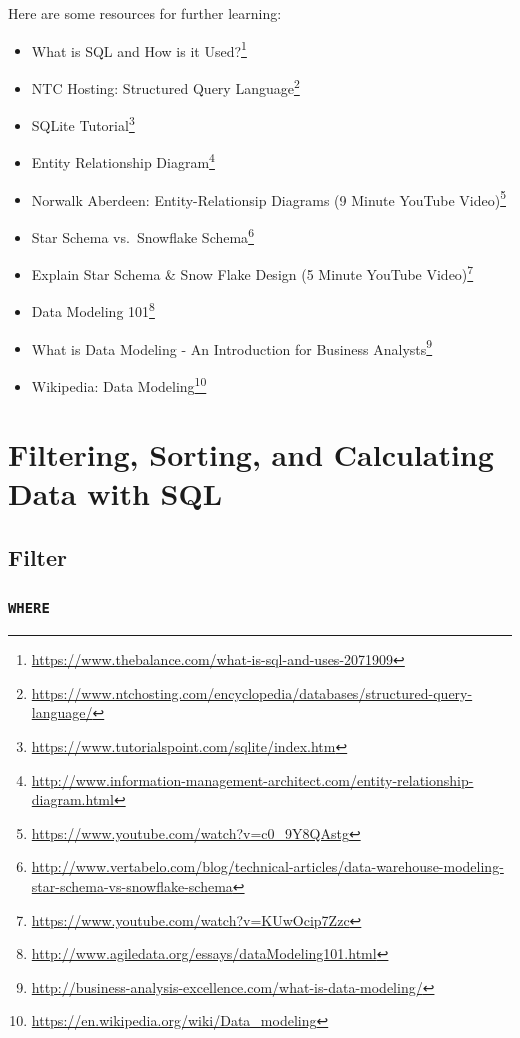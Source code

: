 \documentclass[]{book}
\providecommand{\tightlist}{%
  \setlength{\itemsep}{0pt}\setlength{\parskip}{0pt}}
\renewcommand{\href}[2]{#2\footnote{\url{#1}}}
\theoremstyle{definition}
\theoremstyle{definition}
\theoremstyle{remark}
\begin{document}
Here are some resources for further learning:

\begin{itemize}
\tightlist
\item
  \href{https://www.thebalance.com/what-is-sql-and-uses-2071909}{What is
  SQL and How is it Used?}
\item
  \href{https://www.ntchosting.com/encyclopedia/databases/structured-query-language/}{NTC
  Hosting: Structured Query Language}
\item
  \href{https://www.tutorialspoint.com/sqlite/index.htm}{SQLite
  Tutorial}
\item
  \href{http://www.information-management-architect.com/entity-relationship-diagram.html}{Entity
  Relationship Diagram}
\item
  \href{https://www.youtube.com/watch?v=c0_9Y8QAstg}{Norwalk Aberdeen:
  Entity-Relationsip Diagrams (9 Minute YouTube Video)}
\item
  \href{http://www.vertabelo.com/blog/technical-articles/data-warehouse-modeling-star-schema-vs-snowflake-schema}{Star
  Schema vs.~Snowflake Schema}
\item
  \href{https://www.youtube.com/watch?v=KUwOcip7Zzc}{Explain Star Schema
  \& Snow Flake Design (5 Minute YouTube Video)}
\item
  \href{http://www.agiledata.org/essays/dataModeling101.html}{Data
  Modeling 101}
\item
  \href{http://business-analysis-excellence.com/what-is-data-modeling/}{What
  is Data Modeling - An Introduction for Business Analysts}
\item
  \href{https://en.wikipedia.org/wiki/Data_modeling}{Wikipedia: Data
  Modeling}
\end{itemize}

\chapter{Filtering, Sorting, and Calculating Data with
SQL}\label{filtering-sorting-and-calculating-data-with-sql}

\section{Filter}\label{filter}

\subsection{\texorpdfstring{\texttt{WHERE}}{WHERE}}\label{where}
\end{document}
